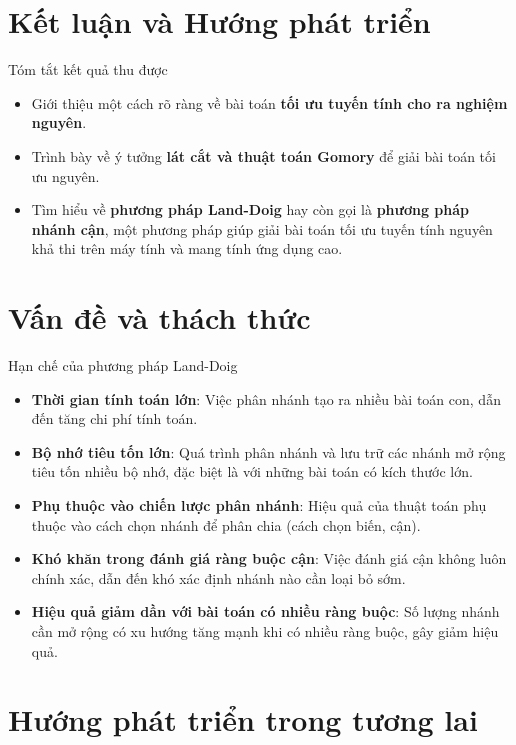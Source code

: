\documentclass[10pt]{beamer}
\begin{document}
\section{Kết luận và Hướng phát triển}
\begin{frame}{Tóm tắt kết quả thu được}
\bigskip
\begin{itemize}
    \item<2-> Giới thiệu một cách rõ ràng về bài toán \textbf{tối ưu tuyến tính cho ra nghiệm nguyên}.
    \medskip
    \item<3-> Trình bày về ý tưởng \textbf{lát cắt và thuật toán Gomory} để giải bài toán tối ưu nguyên.
    \medskip
	\item<4-> Tìm hiểu về \textbf{phương pháp Land-Doig} hay còn gọi là \textbf{phương pháp nhánh cận}, một phương pháp giúp giải bài toán tối ưu tuyến tính nguyên khả thi trên máy tính và mang tính ứng dụng cao.
\end{itemize}
\end{frame}
\section*{Vấn đề và thách thức}
\begin{frame}{Hạn chế của phương pháp Land-Doig}
\begin{itemize}
    \item<1-> \textbf{Thời gian tính toán lớn}: Việc phân nhánh tạo ra nhiều bài toán con, dẫn đến tăng chi phí tính toán.
    \item<2-> \textbf{Bộ nhớ tiêu tốn lớn}: Quá trình phân nhánh và lưu trữ các nhánh mở rộng tiêu tốn nhiều bộ nhớ, đặc biệt là với những bài toán có kích thước lớn.
    \item<3-> \textbf{Phụ thuộc vào chiến lược phân nhánh}: Hiệu quả của thuật toán phụ thuộc vào cách chọn nhánh để phân chia (cách chọn biến, cận).
    \item<4-> \textbf{Khó khăn trong đánh giá ràng buộc cận}: Việc đánh giá cận không luôn chính xác, dẫn đến khó xác định nhánh nào cần loại bỏ sớm.
    \item<5-> \textbf{Hiệu quả giảm dần với bài toán có nhiều ràng buộc}: Số lượng nhánh cần mở rộng có xu hướng tăng mạnh khi có nhiều ràng buộc, gây giảm hiệu quả.
\end{itemize}
\end{frame}

\section*{Hướng phát triển trong tương lai}
\end{document}
